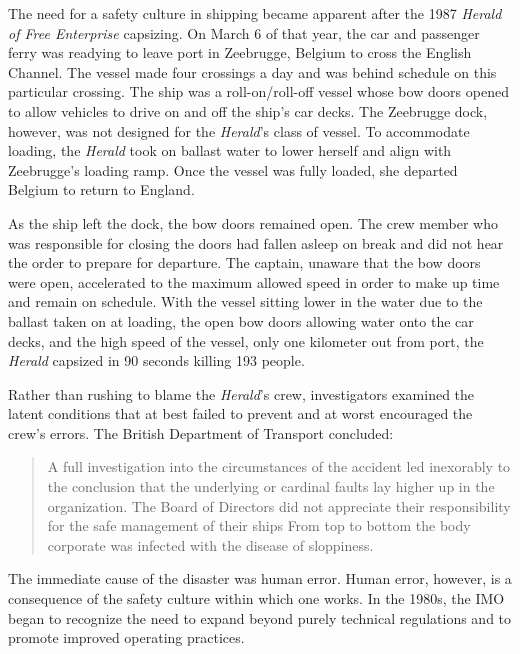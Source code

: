 \documentclass[twoside,symmetric,notoc]{tufte-book}
\begin{document}
\par{%
The need for a safety culture in shipping became apparent after the 1987 \textit{Herald of Free Enterprise} capsizing. On March 6 of that year, the car and passenger ferry was readying to leave port in Zeebrugge, Belgium to cross the English Channel. The vessel made four crossings a day and was behind schedule on this particular crossing. The ship was a roll-on/roll-off vessel whose bow doors opened to allow vehicles to drive on and off the ship's car decks. The Zeebrugge dock, however, was not designed for the \textit{Herald}'s class of vessel. To accommodate loading, the \textit{Herald} took on ballast water to lower herself and align with Zeebrugge's loading ramp. Once the vessel was fully loaded, she departed Belgium to return to England.
}
\par{%
As the ship left the dock, the bow doors remained open. The crew member who was responsible for closing the doors had fallen asleep on break and did not hear the order to prepare for departure. The captain, unaware that the bow doors were open, accelerated to the maximum allowed speed in order to make up time and remain on schedule. With the vessel sitting lower in the water due to the ballast taken on at loading, the open bow doors allowing water onto the car decks, and the high speed of the vessel, only one kilometer out from port, the \textit{Herald} capsized in 90 seconds killing 193 people.\cite{MAIB_investigation} 
}
\par{%
Rather than rushing to blame the \textit{Herald}'s crew, investigators examined the latent conditions that at best failed to prevent and at worst encouraged the crew's errors. The British Department of Transport concluded: 
\begin{quotation}
A full investigation into the circumstances of the accident led inexorably to the conclusion that the underlying or cardinal faults lay higher up in the organization. The Board of Directors did not appreciate their responsibility for the safe management of their ships \textellipsis From top to bottom the body corporate was infected with the disease of sloppiness.
\end{quotation}
The immediate cause of the disaster was human error. Human error, however, is a consequence of the safety culture within which one works.\cite{Reason_1997} In the 1980s, the IMO began to recognize the need to expand beyond purely technical regulations and to promote improved operating practices.
}
\end{document}
